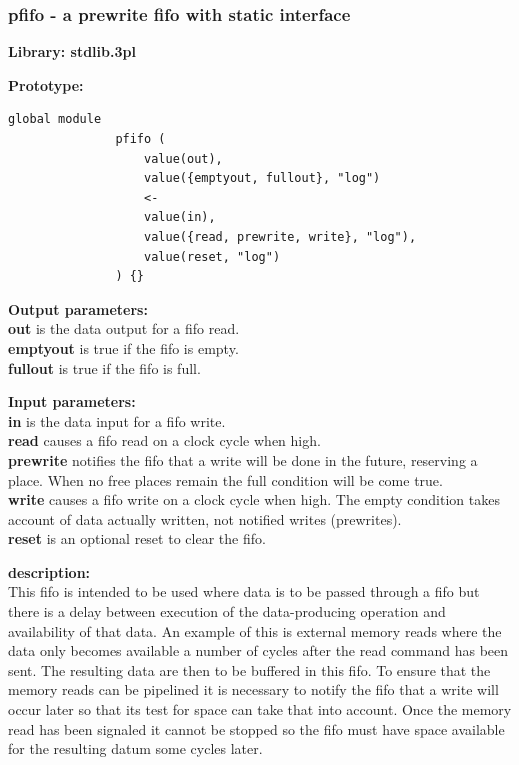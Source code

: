             


        \subsubsection{pfifo - a prewrite fifo with static interface}\label{sec:lmpfifo}

            {\bf Library: stdlib.3pl}

            {\bf Prototype:} \\
            \vsp
            \begin{lstlisting}[gobble=12, language=threepl]
               global module
               pfifo (
                   value(out),
                   value({emptyout, fullout}, "log")
                   <-
                   value(in),
                   value({read, prewrite, write}, "log"),
                   value(reset, "log")
               ) {}
            \end{lstlisting}

            {\bf Output parameters:} \\
            {\bf out} is the data output for a fifo read.\\
            {\bf emptyout} is true if the fifo is empty.\\
            {\bf fullout} is true if the fifo is full.

            {\bf Input parameters:} \\
            {\bf in} is the data input for a fifo write.\\
            {\bf read} causes a fifo read on a clock cycle when high.\\
            {\bf prewrite} notifies the fifo that a write will be done
            in the future, reserving a place. When no free places remain the
            full condition will be come true.\\
            {\bf write} causes a fifo write on a clock cycle when high. The
            empty condition takes account of data actually written, not
            notified writes (prewrites).\\
            {\bf reset} is an optional reset to clear the fifo.

            {\bf description:} \\
            This fifo is intended to be used where data is to be passed
            through a fifo but there is a delay between execution of the
            data-producing operation and availability of that data. An
            example of this is external memory reads where the data only
            becomes available a number of cycles after the read command has
            been sent. The resulting data are then to be buffered in this
            fifo. To ensure that the memory reads can be pipelined it is
            necessary to notify the fifo that a write will occur later so
            that its test for space can take that into account. Once the
            memory read has been signaled it cannot be stopped so the fifo
            must have space available for the resulting datum some cycles
            later.
            
